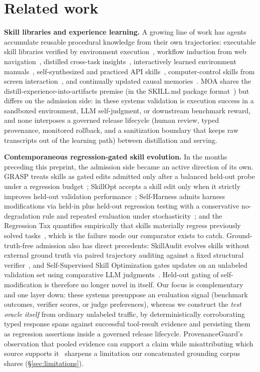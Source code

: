 \documentclass{article}
\newcommand{\moa}{MOA}
\begin{document}
\section{Related work}
\label{sec:related}

\textbf{Skill libraries and experience learning.} A growing line of work has agents accumulate reusable procedural knowledge from their own trajectories: executable skill libraries verified by environment execution~\citep{wang2023voyager}, workflow induction from web navigation~\citep{wang2024awm}, distilled cross-task insights~\citep{zhao2023expel}, interactively learned environment manuals~\citep{chen2024automanual}, self-synthesized and practiced API skills~\citep{zheng2025skillweaver}, computer-control skills from screen interaction~\citep{tan2024cradle}, and continually updated causal memories~\citep{majumder2023clin}. \moa{} shares the distill-experience-into-artifacts premise (in the SKILL.md package format~\citep{anthropic2025skills, agentskills2026spec}) but differs on the admission side: in these systems validation is execution success in a sandboxed environment, LLM self-judgment, or downstream benchmark reward, and none interposes a governed release lifecycle (human review, typed provenance, monitored rollback, and a sanitization boundary that keeps raw transcripts out of the learning path) between distillation and serving.

\textbf{Contemporaneous regression-gated skill evolution.} In the months preceding this preprint, the admission side became an active direction of its own. GRASP treats skills as gated edits admitted only after a balanced held-out probe under a regression budget~\citep{moll2026grasp}; SkillOpt accepts a skill edit only when it strictly improves held-out validation performance~\citep{yang2026skillopt}; Self-Harness admits harness modifications via held-in plus held-out regression testing with a conservative no-degradation rule and repeated evaluation under stochasticity~\citep{zhang2026selfharness}; and the Regression Tax quantifies empirically that skills materially regress previously solved tasks~\citep{tank2026regressiontax}, which is the failure mode our comparator exists to catch. Ground-truth-free admission also has direct precedents: SkillAudit evolves skills without external ground truth via paired trajectory auditing against a fixed structural verifier~\citep{gao2026skillaudit}, and Self-Supervised Skill Optimization gates updates on an unlabeled validation set using comparative LLM judgments~\citep{peng2026sso}. Held-out gating of self-modification is therefore no longer novel in itself. Our focus is complementary and one layer down: these systems presuppose an evaluation signal (benchmark outcomes, verifier scores, or judge preferences), whereas we construct the \emph{test oracle itself} from ordinary unlabeled traffic, by deterministically corroborating typed response spans against successful tool-result evidence and persisting them as regression assertions inside a governed release lifecycle. ProvenanceGuard's observation that pooled evidence can support a claim while misattributing which source supports it~\citep{alvarez2026provenanceguard} sharpens a limitation our concatenated grounding corpus shares (\S\ref{sec:limitations}).
\end{document}
